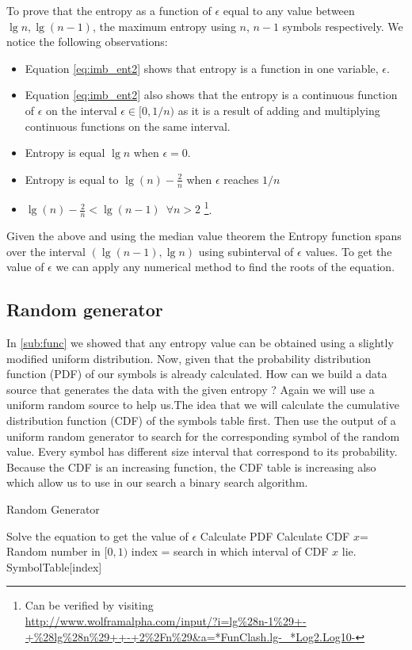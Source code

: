 To prove that the entropy as a function of $\epsilon$ equal to any value between $\lg n, \lg (n-1)$, the maximum entropy using $n$, $n-1$ symbols respectively. We notice the following observations:\\
\begin{itemize}
\item Equation \ref{eq:imb_ent2} shows that entropy is a function in one variable, $\epsilon$.
\item Equation \ref{eq:imb_ent2} also shows that the entropy is a continuous function of $\epsilon$ on the interval $\epsilon \in [0,1/n)$ as it is a result of adding and multiplying continuous functions on the same interval.
\item Entropy is equal $\lg n$ when $\epsilon = 0$.
\item Entropy is equal to $\lg(n) -\frac{2}{n}$  when $\epsilon$ reaches $1/n$
\item $\lg(n) - \frac{2}{n} < \lg(n-1) \,\,\, \forall n > 2$ \footnote{Can be verified by visiting\\ 
\url{http://www.wolframalpha.com/input/?i=lg\%28n-1\%29+-+\%28lg\%28n\%29++-+2\%2Fn\%29&a=*FunClash.lg-_*Log2.Log10-}}.
\end{itemize}
Given the above and using the median value theorem the Entropy function spans over the interval $(\lg (n-1), \lg n)$ using subinterval of $\epsilon$ values.
To get the value of $\epsilon$ we can apply any numerical method to find the roots of the equation.

\subsection{Random generator}\label{sub:gen_des}
In \ref{sub:func} we showed that any entropy value can be obtained using a slightly modified uniform distribution.
Now, given that the probability distribution function (PDF) of our symbols is already calculated.
How can we build a data source that generates the data with the given entropy ?
Again we will use a uniform random source to help us.The idea that we will calculate the cumulative distribution
function (CDF) of the symbols table first. Then use the output of a uniform random generator to search for the
corresponding symbol of the random value. Every symbol has different size interval that correspond to its probability.
Because the CDF is an increasing function, the CDF table is increasing also which allow us to use in our search a binary
search algorithm. 
\begin{algorithm}
\caption{Random Generator}
\label{alg:rnd}
\begin{algorithmic}
\STATE Solve the equation to get the value of $\epsilon$
\STATE Calculate PDF
\STATE Calculate CDF
\STATE $x$= Random number in $[0,1)$
\STATE index = search in which interval of CDF $x$ lie.
\RETURN SymbolTable[index]
\ENDFOR
\end{algorithmic}
\end{algorithm}


